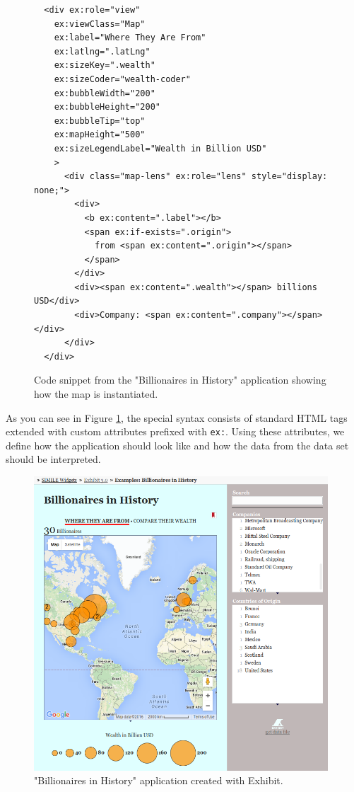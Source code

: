 \begin{figure}
\centering

  \begin{verbatim}
  <div ex:role="view"
    ex:viewClass="Map"
    ex:label="Where They Are From"
    ex:latlng=".latLng"
    ex:sizeKey=".wealth"
    ex:sizeCoder="wealth-coder"
    ex:bubbleWidth="200"
    ex:bubbleHeight="200"
    ex:bubbleTip="top"
    ex:mapHeight="500"
    ex:sizeLegendLabel="Wealth in Billion USD"
    >
      <div class="map-lens" ex:role="lens" style="display: none;">
        <div>
          <b ex:content=".label"></b>
          <span ex:if-exists=".origin">
          	from <span ex:content=".origin"></span>
          </span>
        </div>
        <div><span ex:content=".wealth"></span> billions USD</div>
        <div>Company: <span ex:content=".company"></span></div>
      </div>
  </div>
  \end{verbatim}  
  \caption{Code snippet from the "Billionaires in History" application \cite{exhibit_example} showing how the map is instantiated.}
  \label{fig:exhibit-map-code-snippet}
\end{figure}

As you can see in Figure \ref{fig:exhibit-map-code-snippet}, the special syntax consists of standard HTML tags extended with custom attributes prefixed with \texttt{ex:}. Using these attributes, we define how the application should look like and how the data from the data set should be interpreted.

\begin{figure}
	\centering
	\includegraphics[width=110mm]{img/02_exhibit.png}
	\caption{"Billionaires in History" application \cite{exhibit_example} created with Exhibit.} 
	\label{fig:exhibit-map-example}
\end{figure}

